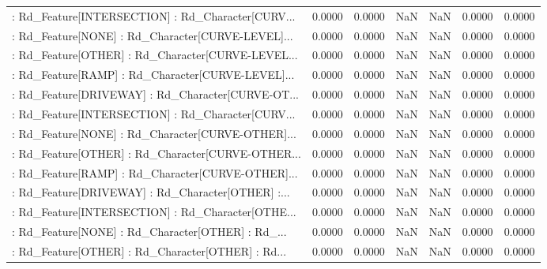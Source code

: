 \begin{longtable}{p{4cm}cccccc}
 : Rd\_Feature[INTERSECTION] : Rd\_Character[CURV... &            0.0000 &            0.0000 &     NaN &          NaN &             0.0000 &            0.0000 \\
 : Rd\_Feature[NONE] : Rd\_Character[CURVE-LEVEL]... &            0.0000 &            0.0000 &     NaN &          NaN &             0.0000 &            0.0000 \\
 : Rd\_Feature[OTHER] : Rd\_Character[CURVE-LEVEL... &            0.0000 &            0.0000 &     NaN &          NaN &             0.0000 &            0.0000 \\
 : Rd\_Feature[RAMP] : Rd\_Character[CURVE-LEVEL]... &            0.0000 &            0.0000 &     NaN &          NaN &             0.0000 &            0.0000 \\
 : Rd\_Feature[DRIVEWAY] : Rd\_Character[CURVE-OT... &            0.0000 &            0.0000 &     NaN &          NaN &             0.0000 &            0.0000 \\
 : Rd\_Feature[INTERSECTION] : Rd\_Character[CURV... &            0.0000 &            0.0000 &     NaN &          NaN &             0.0000 &            0.0000 \\
 : Rd\_Feature[NONE] : Rd\_Character[CURVE-OTHER]... &            0.0000 &            0.0000 &     NaN &          NaN &             0.0000 &            0.0000 \\
 : Rd\_Feature[OTHER] : Rd\_Character[CURVE-OTHER... &            0.0000 &            0.0000 &     NaN &          NaN &             0.0000 &            0.0000 \\
 : Rd\_Feature[RAMP] : Rd\_Character[CURVE-OTHER]... &            0.0000 &            0.0000 &     NaN &          NaN &             0.0000 &            0.0000 \\
 : Rd\_Feature[DRIVEWAY] : Rd\_Character[OTHER] :... &            0.0000 &            0.0000 &     NaN &          NaN &             0.0000 &            0.0000 \\
 : Rd\_Feature[INTERSECTION] : Rd\_Character[OTHE... &            0.0000 &            0.0000 &     NaN &          NaN &             0.0000 &            0.0000 \\
 : Rd\_Feature[NONE] : Rd\_Character[OTHER] : Rd\_... &            0.0000 &            0.0000 &     NaN &          NaN &             0.0000 &            0.0000 \\
 : Rd\_Feature[OTHER] : Rd\_Character[OTHER] : Rd... &            0.0000 &            0.0000 &     NaN &          NaN &             0.0000 &            0.0000 \\

\end{longtable}
